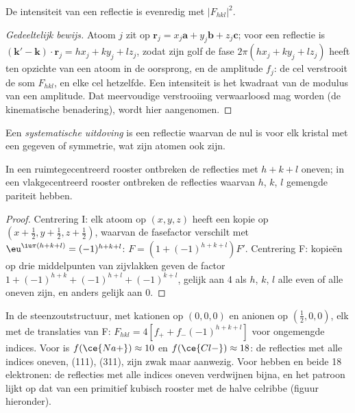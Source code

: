 \begin{proposition}[Intensiteit]\label{prop:b3:x-ray-diffraction:intensity}
De intensiteit van een reflectie is evenredig met $|F_{hkl}|^2$.
\end{proposition}

\begin{proof}[Gedeeltelijk bewijs]
Atoom $j$ zit op $\mathbf r_j = x_j\mathbf a + y_j\mathbf b + z_j\mathbf c$; voor een reflectie is
$(\mathbf k' - \mathbf k)\cdot\mathbf r_j = hx_j + ky_j + lz_j$, zodat zijn golf de fase
$2\pi(hx_j + ky_j + lz_j)$ heeft ten opzichte van een atoom in de
oorsprong, en de amplitude $f_j$:
de cel verstrooit de som $F_{hkl}$, en elke cel hetzelfde. Een intensiteit
is het kwadraat van de modulus van een amplitude. Dat meervoudige
verstrooiing verwaarloosd mag worden (de kinematische benadering), wordt
hier aangenomen.
\end{proof}

\begin{definition}\label{def:b3:x-ray-diffraction:absence}
Een \emph{systematische uitdoving} is een
reflectie waarvan de
 nul is voor elk kristal met een gegeven 
of symmetrie, wat zijn atomen ook zijn.
\end{definition}

\begin{proposition}\label{prop:b3:x-ray-diffraction:absences}
In een ruimtegecentreerd rooster ontbreken de reflecties met $h + k + l$
oneven; in een vlakgecentreerd rooster ontbreken de reflecties waarvan
$h$, $k$, $l$ gemengde pariteit hebben.
\end{proposition}

\begin{proof}
Centrering I: elk atoom op $(x,y,z)$ heeft een kopie op $(x + \frac12, y + \frac12, z + \frac12)$,
waarvan de fasefactor verschilt met $\eu^{\iu\pi(h+k+l)} = (-1)^{h+k+l}$: $F = (1 +
(-1)^{h+k+l})F'$. Centrering F: kopieën op drie middelpunten van zijvlakken
geven de factor $1 +
(-1)^{h+k} + (-1)^{h+l} + (-1)^{k+l}$, gelijk aan 4 als $h$, $k$, $l$ alle even
of alle oneven zijn, en anders gelijk aan 0.
\end{proof}

\begin{example}\label{ex:b3:x-ray-diffraction:nacl-kcl}
In de steenzoutstructuur, met kationen op $(0,0,0)$ en anionen op $(\frac12,0,0)$, elk
met de translaties van F: $F_{hkl} = 4[f_+ + f_-(-1)^{h+k+l}]$ voor
ongemengde indices.
Voor  is $f(\ce{Na+}) \approx 10$ en $f(\ce{Cl-}) \approx 18$: de
reflecties met alle indices oneven,
(111), (311), zijn zwak maar aanwezig. Voor  hebben  en
 beide 18
elektronen: de reflecties met alle indices oneven verdwijnen bijna, en het
patroon lijkt op dat van een primitief kubisch rooster met de halve
celribbe (figuur hieronder).
\end{example}

